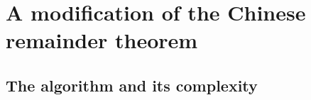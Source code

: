 \documentclass{amsart}
\newcommand{\Z}{{\bf{Z}}}
\newcommand{\F}{{\bf{F}}}
\newcommand{\Fp}{{\F}_p}
\newcommand{\OO}{\mathcal{O}}
\theoremstyle{plain}
\begin{document}
%
%

\section{A modification of the Chinese remainder theorem} \label{section:couv}

\subsection{The algorithm and its complexity} \label{couveignes-algo}
\end{document}

